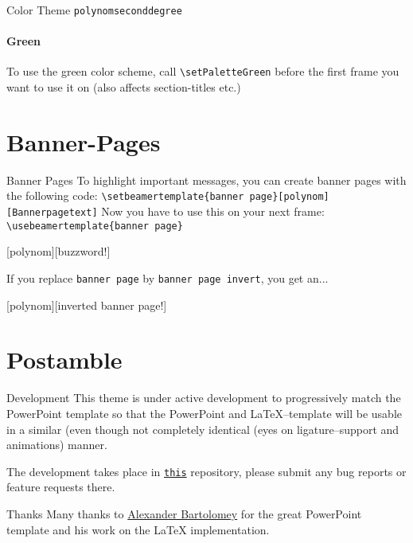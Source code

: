 \documentclass[fragile=singleslide]{beamer}
\begin{document}
\setPaletteGreen
\begin{frame}[fragile=singleslide]{Color Theme \texttt{polynomseconddegree}}
  \framesubtitle{Green}

  To use the green color scheme, call \verb|\setPaletteGreen|
  before the first frame you want to use it on (also affects
  section-titles etc.) \\
  \paletteColors
  
\end{frame}
\setPaletteBlue

\section{Banner-Pages}
\begin{frame}[fragile=singleslide]{Banner Pages}
  To highlight important messages, you can create banner pages with the
  following code:
  \verb|\setbeamertemplate{banner page}[polynom][Bannerpagetext]|
  Now you have to use this on your next frame:
  \verb|\usebeamertemplate{banner page}|
\end{frame}

[polynom][buzzword!]
\begin{frame}
\end{frame}

\begin{frame}[fragile=singleslide]
  If you replace \verb|banner page| by
  \verb|banner page invert|, you get an...
\end{frame}


[polynom][inverted banner page!]
\begin{frame}
\end{frame}


\section{Postamble}
\begin{frame}{Development}
  This theme is under active development to progressively match the
  PowerPoint template so that the PowerPoint and LaTeX--template will
  be usable in a similar (even though not completely identical (eyes on
  ligature--support and animations) manner.

  The development takes place in
  \href{https://git.rwth-aachen.de/ACHinrichs/LaTeX-templates/}{\texttt{this}}
  repository, please submit any bug reports or feature requests there.
\end{frame}

\begin{frame}{Thanks}
  Many thanks to \href{https://www.occloxium.com/}{Alexander Bartolomey} for 
  the great PowerPoint template and his work on the LaTeX implementation. 
\end{frame}
\end{document}
